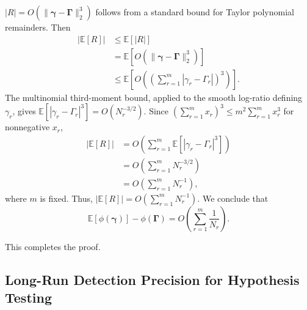 \documentclass{article}
\begin{document}
$|R|=O(\lVert\boldsymbol{\gamma}-\boldsymbol{\Gamma}\rVert_2^3)$ follows
from a standard bound for Taylor polynomial remainders. Then
\begin{align*}
|\mathbb{E}[R]|
&\leq\mathbb{E}[|R|]\\
&=\mathbb{E}\!\left[O\!\left(
\lVert\boldsymbol{\gamma}-\boldsymbol{\Gamma}\rVert_2^3\right)\right]\\
&\leq\mathbb{E}\!\left[O\!\left(
\left(\sum_{r=1}^m|\gamma_r-\Gamma_r|\right)^3\right)\right].
\end{align*}
The multinomial third-moment bound, applied to the smooth log-ratio defining
$\gamma_r$, gives
$\mathbb{E}[|\gamma_r-\Gamma_r|^3]=O(N_r^{-3/2})$. Since
$(\sum_{r=1}^m x_r)^3\leq m^2\sum_{r=1}^m x_r^3$ for nonnegative $x_r$,
\begin{align*}
|\mathbb{E}[R]|
&=O\!\left(\sum_{r=1}^m
\mathbb{E}[|\gamma_r-\Gamma_r|^3]\right)\\
&=O\!\left(\sum_{r=1}^mN_r^{-3/2}\right)\\
&=O\!\left(\sum_{r=1}^mN_r^{-1}\right),
\end{align*}
where $m$ is fixed. Thus,
$|\mathbb{E}[R]|=O(\sum_{r=1}^mN_r^{-1})$. We conclude that
\[
\mathbb{E}[\phi(\boldsymbol{\gamma})]-\phi(\boldsymbol{\Gamma})
=O\!\left(\sum_{r=1}^m\frac{1}{N_r}\right).
\]

This completes the proof.

\subsection{Long-Run Detection Precision for Hypothesis Testing}
\label{app:hypothesis-detection-precision}
\end{document}
